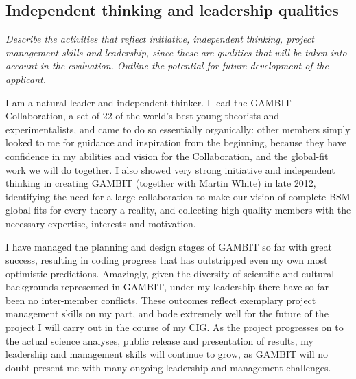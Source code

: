 \documentclass[a4paper,11pt]{article}
\newenvironment{xcomment}{\em}{}
\begin{document}
\subsection{Independent thinking and leadership qualities}
\label{leadership}

\begin{xcomment}
Describe the activities that reflect initiative, independent thinking,
project management skills and leadership, since these are qualities
that will be taken into account in the evaluation. Outline the
potential for future development of the applicant.
\end{xcomment}

I am a natural leader and independent thinker.  I lead the GAMBIT Collaboration, a set of 22 of the world's best young theorists and experimentalists, and came to do so essentially organically: other members simply looked to me for guidance and inspiration from the beginning, because they have confidence in my abilities and vision for the Collaboration, and the global-fit work we will do together.  I also showed very strong initiative and independent thinking in creating GAMBIT (together with Martin White) in late 2012, identifying the need for a large collaboration to make our vision of complete BSM global fits for every theory a reality, and collecting high-quality members with the necessary expertise, interests and motivation. 

I have managed the planning and design stages of GAMBIT so far with great success, resulting in coding progress that has outstripped even my own most optimistic predictions.  Amazingly, given the diversity of scientific and cultural backgrounds represented in GAMBIT, under my leadership there have so far been no inter-member conflicts.  These outcomes reflect exemplary project management skills on my part, and bode extremely well for the future of the project I will carry out in the course of my CIG.  As the project progresses on to the actual science analyses, public release and presentation of results, my leadership and management skills will continue to grow, as GAMBIT will no doubt present me with many ongoing leadership and management challenges.  
\end{document}
